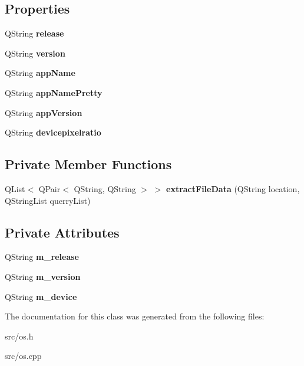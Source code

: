 \subsection*{Properties}
\begin{DoxyCompactItemize}
\item 
\mbox{\label{classOS_ac78395d05ca770df0e6136dca18cf682}} 
Q\+String {\bfseries release}
\item 
\mbox{\label{classOS_af9d3ad8c99dd34d874634eae3163dcc3}} 
Q\+String {\bfseries version}
\item 
\mbox{\label{classOS_af9d6295c5361884c9c7c25b13db70720}} 
Q\+String {\bfseries app\+Name}
\item 
\mbox{\label{classOS_a5ecf65ef8f4ac491323d1590c2cb4e67}} 
Q\+String {\bfseries app\+Name\+Pretty}
\item 
\mbox{\label{classOS_a8162949b8a268b409967ae356947e059}} 
Q\+String {\bfseries app\+Version}
\item 
\mbox{\label{classOS_aa40d035f4f4b1f67c6c103cd3b3cfc08}} 
Q\+String {\bfseries devicepixelratio}
\end{DoxyCompactItemize}
\subsection*{Private Member Functions}
\begin{DoxyCompactItemize}
\item 
\mbox{\label{classOS_a5703fdddfbee21d53e71906d509df442}} 
Q\+List$<$ Q\+Pair$<$ Q\+String, Q\+String $>$ $>$ {\bfseries extract\+File\+Data} (Q\+String location, Q\+String\+List querry\+List)
\end{DoxyCompactItemize}
\subsection*{Private Attributes}
\begin{DoxyCompactItemize}
\item 
\mbox{\label{classOS_a61a80d72fb7d8be61c14a0363e81176a}} 
Q\+String {\bfseries m\+\_\+release}
\item 
\mbox{\label{classOS_a483dfd8fcc3c9e240f05638f01c697fa}} 
Q\+String {\bfseries m\+\_\+version}
\item 
\mbox{\label{classOS_aae83217d6785449722cae783468cb6ba}} 
Q\+String {\bfseries m\+\_\+device}
\end{DoxyCompactItemize}


The documentation for this class was generated from the following files\+:\begin{DoxyCompactItemize}
\item 
src/os.\+h\item 
src/os.\+cpp\end{DoxyCompactItemize}
